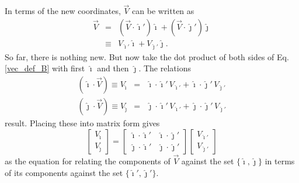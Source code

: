 \documentclass[10pt]{article}
\begin{document}
In terms of the new coordinates, $\vec V$ can be written as
\begin{eqnarray}\label{vec_def_B}
  \vec V & =       &   \left( \vec V \cdot \hat \imath' \right) \hat \imath 
                     + \left( \vec V \cdot \hat \jmath' \right) \hat \jmath \\
         & \equiv  &   V_{\hat \imath'} \hat \imath 
                     + V_{\hat \jmath'} \hat \jmath .
\end{eqnarray}
So far, there is nothing new.  But now take the dot product of both sides
of Eq. \ref{vec_def_B} with first $\hat \imath$ and then $\hat \jmath$.
The relations
\begin{eqnarray}\label{vec_rel_A}
\left(\hat \imath \cdot \vec V \right) \equiv V_{\hat \imath} 
   & = &
    \hat \imath \cdot \hat \imath' \, V_{\hat \imath'}
+  \hat \imath \cdot \hat \jmath' \, V_{\hat \jmath'} \\
\left(\hat \jmath \cdot \vec V \right) \equiv V_{\hat \jmath} 
   & = &
    \hat \jmath \cdot \hat \imath' \, V_{\hat \imath'}
+  \hat \jmath \cdot \hat \jmath' \, V_{\hat \jmath'}
\end{eqnarray}
result.  Placing these into matrix form gives
\begin{equation}\label{vec_rel_B}
\left[ \begin{array}{c} V_{\hat \imath} \\ V_{\hat \jmath} \end{array} \right]
   = 
\left[ \begin{array}{cc} \hat \imath \cdot \hat \imath' & \hat \imath \cdot \hat \jmath' \\
                          \hat \jmath \cdot \hat \imath' & \hat \jmath \cdot \hat \jmath' 
        \end{array} \right]
\left[ \begin{array}{c} V_{\hat \imath'} \\ V_{\hat \jmath'} \end{array} \right]        
\end{equation}
as the equation for relating the components of $\vec V$ against the set 
$\{ \hat \imath, \hat \jmath \}$ in terms of its components against the
set $\{ \hat \imath', \hat \jmath' \}$.
\end{document}

